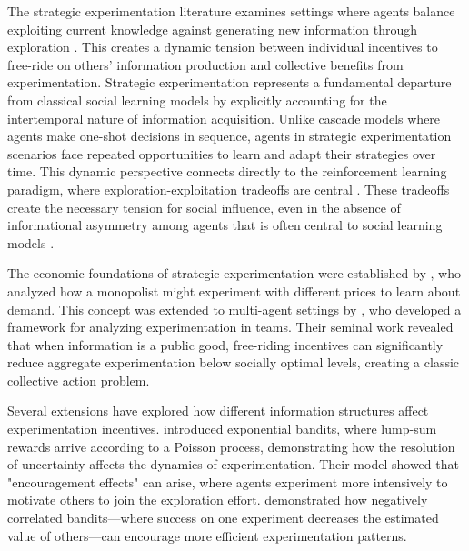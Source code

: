 \documentclass[a4paper,12pt]{report}
\begin{document}
The strategic experimentation literature examines settings where agents balance exploiting current knowledge against generating new information through exploration \citep{bolton1999strategic, keller2005strategic}. This creates a dynamic tension between individual incentives to free-ride on others' information production and collective benefits from experimentation. Strategic experimentation represents a fundamental departure from classical social learning models by explicitly accounting for the intertemporal nature of information acquisition. Unlike cascade models where agents make one-shot decisions in sequence, agents in strategic experimentation scenarios face repeated opportunities to learn and adapt their strategies over time. This dynamic perspective connects directly to the reinforcement learning paradigm, where exploration-exploitation tradeoffs are central \citep{sutton2018reinforcement}. These tradeoffs create the necessary tension for social influence, even in the absence of informational asymmetry among agents that is often central to social learning models \citep{gale2003bayesian}.

The economic foundations of strategic experimentation were established by \citet{rothschild1974two}, who analyzed how a monopolist might experiment with different prices to learn about demand. This concept was extended to multi-agent settings by \citet{bolton1999strategic}, who developed a framework for analyzing experimentation in teams. Their seminal work revealed that when information is a public good, free-riding incentives can significantly reduce aggregate experimentation below socially optimal levels, creating a classic collective action problem.

Several extensions have explored how different information structures affect experimentation incentives. \citet{keller2005strategic} introduced exponential bandits, where lump-sum rewards arrive according to a Poisson process, demonstrating how the resolution of uncertainty affects the dynamics of experimentation. Their model showed that "encouragement effects" can arise, where agents experiment more intensively to motivate others to join the exploration effort. \citet{klein2011negatively} demonstrated how negatively correlated bandits—where success on one experiment decreases the estimated value of others—can encourage more efficient experimentation patterns.
\iffalse
    \citet{bonatti2017dynamic} further showed how competition in experimentation can sometimes overcome free-riding tendencies and increase information production through strategic preemption.\fi
\end{document}
